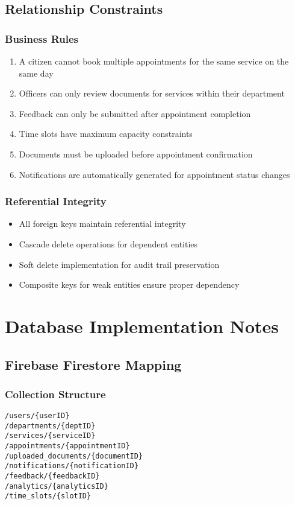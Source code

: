 \documentclass[12pt,a4paper]{article}
\begin{document}
\subsection{Relationship Constraints}

\subsubsection{Business Rules}
\begin{enumerate}[leftmargin=*]
    \item A citizen cannot book multiple appointments for the same service on the same day
    \item Officers can only review documents for services within their department
    \item Feedback can only be submitted after appointment completion
    \item Time slots have maximum capacity constraints
    \item Documents must be uploaded before appointment confirmation
    \item Notifications are automatically generated for appointment status changes
\end{enumerate}

\subsubsection{Referential Integrity}
\begin{itemize}[leftmargin=*]
    \item All foreign keys maintain referential integrity
    \item Cascade delete operations for dependent entities
    \item Soft delete implementation for audit trail preservation
    \item Composite keys for weak entities ensure proper dependency
\end{itemize}

\section{Database Implementation Notes}

\subsection{Firebase Firestore Mapping}

\subsubsection{Collection Structure}
\begin{verbatim}
/users/{userID}
/departments/{deptID}
/services/{serviceID}
/appointments/{appointmentID}
/uploaded_documents/{documentID}
/notifications/{notificationID}
/feedback/{feedbackID}
/analytics/{analyticsID}
/time_slots/{slotID}
\end{verbatim}
\end{document}

